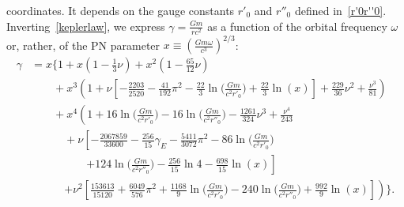 \documentclass[prd,preprint,superscriptaddress,tightenlines,nofootinbib,
  eqsecnum,showpacs]{revtex4}
\begin{document}
coordinates. It depends on the gauge constants $r'_0$ and
$r''_0$ defined in~\eqref{r'0r''0}. Inverting~\eqref{keplerlaw}, we express
$\gamma=\frac{G m}{r c^2}$ as a function of the orbital frequency $\omega$ or,
rather, of the PN parameter $x\equiv (\frac{G m \omega}{c^3})^{2/3}$:
%
\begin{align}\label{gammax}
 \gamma &= x \bigg\{1  + x \left(1 -  \frac{1}{3} \nu\right) 
+ x^2 \left(1 -  \frac{65}{12} \nu\right)  \nonumber\\
 &\qquad  + x^3 \left(1 + \nu \left[- \frac{2203}{2520} 
-  \frac{41}{192} \pi^2  -  \frac{22}{3} \ln\Big(\frac{G m}{c^2 r'_{0}}\Big) 
+ \frac{22}{3} \ln(x)\right] + \frac{229}{36} \nu^2 
+ \frac{\nu^3}{81} \right) \nonumber\\
&\qquad + x^4 \left(1 + 16 \ln\Big(\frac{G m}{c^2 r'_{0}}\Big)  
- 16 \ln\Big(\frac{G m}{c^2 r''_{0}}\Big) -  \frac{1261}{324} \nu^3 
+ \frac{\nu^4}{243} \right.\nonumber\\
&\qquad\quad+ \nu \left[- \frac{2067859}{33600} - \frac{256}{15} \gamma_E 
-  \frac{5411}{3072} \pi^2 - 86 \ln\Big(\frac{G m}{c^2 r'_{0}}\Big) 
\right.\nonumber\\
&\qquad\qquad\quad \left. + 124 \ln\Big(\frac{G m}{c^2 r''_{0}}\Big) - \frac{256}{15} \ln 4 
- \frac{698}{15} \ln(x)\right]\nonumber\\
&\qquad\quad\left. + \nu^2 \left[\frac{153613}{15120} 
+ \frac{6049}{576} \pi^2 + \frac{1168}{9} \ln\Big(\frac{G m}{c^2 r'_{0}}\Big) 
- 240 \ln\Big(\frac{G m}{c^2 r''_{0}}\Big) 
+ \frac{992}{9} \ln(x)\right] \right)  \bigg\}.
 \end{align}
%
\end{document}

